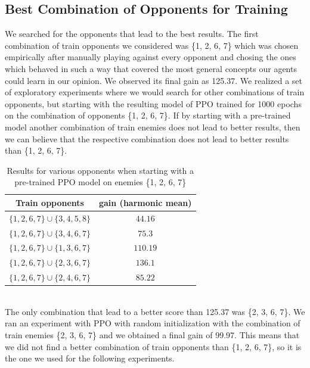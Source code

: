 \documentclass[conference]{IEEEtran}
\begin{document}
    \subsection{Best Combination of Opponents for Training}\label{subsec:best-combination-of-opponents-for-training}
    We searched for the opponents that lead to the best results.
    The first combination of train opponents we considered was \{1, 2, 6, 7\} which was chosen empirically after manually playing against every opponent and chosing the ones which behaved in such a way that covered the most general concepts our agents could learn in our opinion.
    We observed its final gain as 125.37.
    We realized a set of exploratory experiments where we would search for other combinations of train opponents,
    but starting with the resulting model of PPO trained for 1000 epochs on the combination of opponents \{1, 2, 6, 7\}.
    If by starting with a pre-trained model another combination of train enemies does not lead to better results,
    then we can believe that the respective combination does not lead to better results than \{1, 2, 6, 7\}.
    \begin{table}[htbp]
        \caption{Results for various opponents when starting with a pre-trained PPO model on enemies \{1, 2, 6, 7\}}
        \begin{center}
            \begin{tabular}{|c|c|}
                \hline
                \textbf{Train opponents}             & {\textbf{gain (harmonic mean)}} \\
                \hline
                $\{1, 2, 6, 7\} \cup \{3, 4, 5, 8\}$ & $44.16$                         \\
                $\{1, 2, 6, 7\} \cup \{3, 4, 6, 7\}$ & $75.3$                          \\
                $\{1, 2, 6, 7\} \cup \{1, 3, 6, 7\}$ & $110.19$                        \\
                $\{1, 2, 6, 7\} \cup \{2, 3, 6, 7\}$ & $136.1$                         \\
                $\{1, 2, 6, 7\} \cup \{2, 4, 6, 7\}$ & $85.22$                         \\
                \hline
            \end{tabular}
            \label{table:variations_of_opponents}
        \end{center}
    \end{table}
    \\
    The only combination that lead to a better score than 125.37 was \{2, 3, 6, 7\}.
    We ran an experiment with PPO with random initialization with the combination of train enemies \{2, 3, 6, 7\} and
    we obtained a final gain of 99.97.
    This means that we did not find a better combination of train opponents than \{1, 2, 6, 7\}, so it is the one
    we used for the following experiments.
\end{document}
